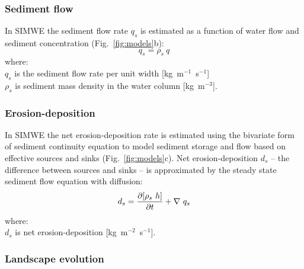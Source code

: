 \documentclass[gmd, manuscript]{copernicus}
\begin{document}

\subsubsection{Sediment flow}

In SIMWE the sediment flow rate $q_s$ is estimated
as a function of water flow and sediment concentration
\citep{Mitas1998}
(Fig.~\ref{fig:models}b): 
\begin{equation}\label{eq:sedflow} 
q_s = \rho_s ~ q
\end{equation}
{\small
\noindent
where: \\
\hspace*{0.5em} $q_s$ is the sediment flow rate per unit width [\unit{kg~m}$^{-1}$~\unit{s}$^{-1}$]\\
\hspace*{0.5em} $\rho_s$ is sediment mass density in the water column [\unit{kg~m}$^{-3}$].\\
}


\subsubsection{Erosion-deposition}

In SIMWE 
the net erosion-deposition rate is estimated
using the bivariate form of sediment continuity equation
to model sediment storage and flow 
based on effective sources and sinks
(Fig.~\ref{fig:models}c). 
Net erosion-deposition $d_s$
-- the difference between sources and sinks --
is approximated by
the steady state sediment flow equation with diffusion:
\begin{equation}\label{eq:sediment} 
d_s = 
{\partial [\rho_s ~ h] \over \partial t} +
\nabla~q_s
\end{equation}
{\small
\noindent
where: \\
\hspace*{0.5em} $d_s$ is net erosion-deposition [\unit{kg~m}$^{-2}$~\unit{s}$^{-1}$].\\
}


\subsubsection{Landscape evolution}
\end{document}
